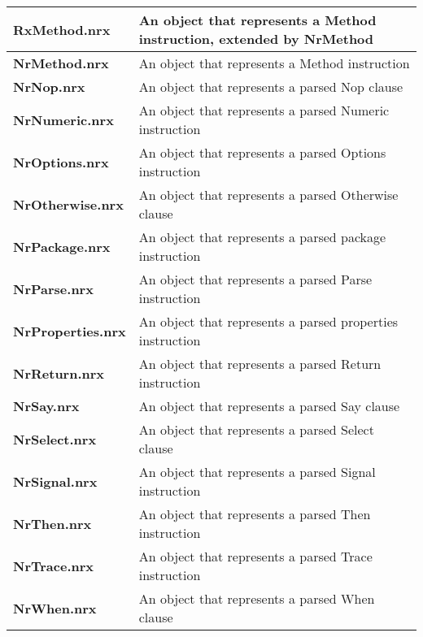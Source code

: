 \begin{table}
\begin{tabularx}{\textwidth}{>{\bfseries}lX}
    \\\midrule
    RxMethod.nrx    &An object that represents a Method instruction, extended by NrMethod
    \\\midrule
    NrMethod.nrx    &An object that represents a Method instruction
    \\\midrule
    NrNop.nrx       &An object that represents a parsed Nop clause
    \\\midrule
    NrNumeric.nrx   &An object that represents a parsed Numeric instruction
    \\\midrule
    NrOptions.nrx   &An object that represents a parsed Options instruction
    \\\midrule
    NrOtherwise.nrx &An object that represents a parsed Otherwise clause
    \\\midrule
    NrPackage.nrx   &An object that represents a parsed package instruction
    \\\midrule
    NrParse.nrx     &An object that represents a parsed Parse instruction
    \\\midrule
    NrProperties.nrx    &An object that represents a parsed properties instruction
    \\\midrule
    NrReturn.nrx    &An object that represents a parsed Return instruction
    \\\midrule
    NrSay.nrx       &An object that represents a parsed Say clause
    \\\midrule
    NrSelect.nrx    &An object that represents a parsed Select clause
    \\\midrule
    NrSignal.nrx    &An object that represents a parsed Signal instruction
    \\\midrule
    NrThen.nrx      &An object that represents a parsed Then instruction
    \\\midrule
    NrTrace.nrx     &An object that represents a parsed Trace instruction
    \\\midrule
    NrWhen.nrx      &An object that represents a parsed When clause
    \\\bottomrule
\end{tabularx}
\end{table}


